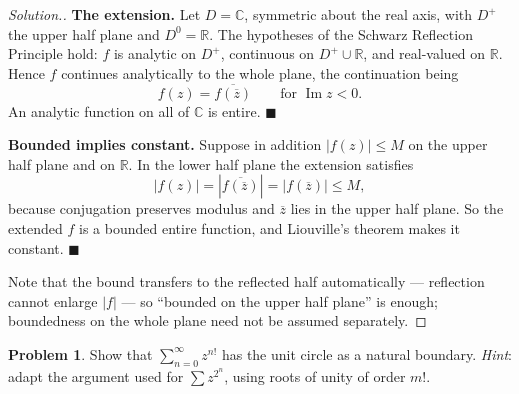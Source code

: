 \documentclass[11pt,a4paper]{article}
\theoremstyle{definition}
\newtheorem{problemx}{Problem}[section]
\newenvironment{problem}{\begin{problemx}}{\end{problemx}}
\newenvironment{solution}
  {\renewcommand{\qedsymbol}{}\begin{proof}[\textit{Solution}.]}
  {\end{proof}}
\begin{document}
\begin{solution}
\textbf{The extension.} Let $D = \mathbb{C}$, symmetric about the real axis, with
$D^{+}$ the upper half plane and $D^{0} = \mathbb{R}$. The hypotheses of the
Schwarz Reflection Principle hold: $f$ is analytic on $D^{+}$, continuous on
$D^{+}\cup\mathbb{R}$, and real-valued on $\mathbb{R}$. Hence $f$ continues
analytically to the whole plane, the continuation being
$$f(z) = \overline{f\!\left(\overline{z}\right)}
\qquad\text{for } \operatorname{Im}z < 0 .$$
An analytic function on all of $\mathbb{C}$ is entire. $\blacksquare$

\textbf{Bounded implies constant.} Suppose in addition
$\left|f(z)\right| \leq M$ on the upper half plane and on $\mathbb{R}$. In the
lower half plane the extension satisfies
$$\left|f(z)\right| = \left|\overline{f\!\left(\overline{z}\right)}\right|
= \left|f\!\left(\overline{z}\right)\right| \leq M,$$
because conjugation preserves modulus and $\overline{z}$ lies in the upper half
plane. So the extended $f$ is a bounded entire function, and Liouville's theorem
makes it constant. $\blacksquare$

Note that the bound transfers to the reflected half automatically --- reflection
cannot enlarge $\left|f\right|$ --- so ``bounded on the upper half plane'' is
enough; boundedness on the whole plane need not be assumed separately.
\end{solution}


\begin{problem}
Show that $\displaystyle\sum^{\infty}_{n = 0} z^{n!}$ has the unit circle as a
natural boundary. \textit{Hint}: adapt the argument used for
$\sum z^{2^n}$, using roots of unity of order $m!$.
\end{problem}
\end{document}
